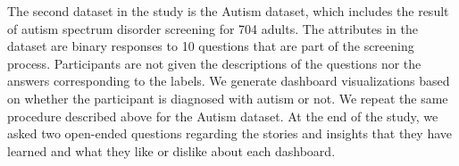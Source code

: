 \par The second dataset in the study is the Autism dataset\cite{autism}, which includes the result of autism spectrum disorder screening for 704 adults. The attributes in the dataset are  binary responses to 10 questions that are part of the screening process. Participants are not given the descriptions of the questions nor the answers corresponding to the labels. We generate dashboard visualizations based on whether the participant is diagnosed with autism or not. We repeat the same procedure described above for the Autism dataset. At the end of the study, we asked two open-ended questions regarding the stories and insights that they have learned and what they like or dislike about each dashboard.
